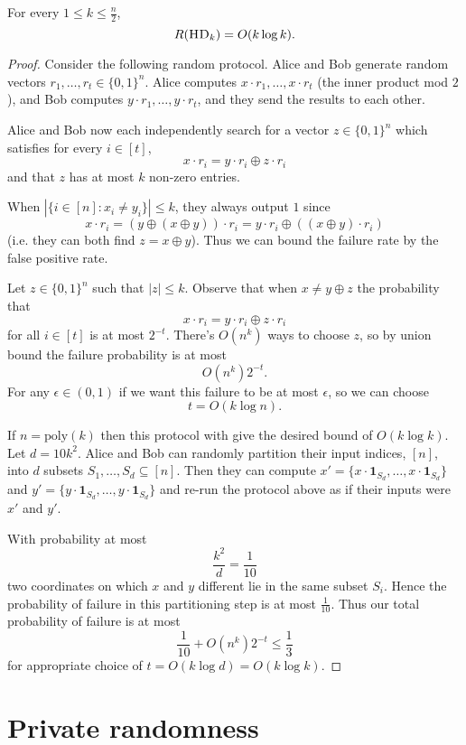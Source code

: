 \begin{theorem}
For every $1 \le k \le \frac n2$,
\[
R(\textsc{HD}_k) = O( k \log k).
\]
\end{theorem}

\begin{proof}
Consider the following random protocol. Alice and Bob generate random vectors $r_1, \dots, r_t \in \{0,1\}^n.$ Alice computes $x\cdot r_1, \dots, x\cdot r_t$ (the inner product mod $2$), and Bob computes $y\cdot r_1, \dots, y \cdot r_t$, and they send the results to each other.

Alice and Bob now each independently search for a vector $z \in \{0,1\}^n$ which satisfies for every $i\in[t]$,
$$x\cdot r_i = y\cdot r_i \oplus z \cdot r_i$$
and that $z$ has at most $k$ non-zero entries.

When $|\{i \in [n]: x_i \neq y_i\}| \leq k$, they always output $1$ since 
$$x\cdot r_i = (y \oplus (x\oplus y)) \cdot r_i = y\cdot r_i \oplus((x\oplus y) \cdot r_i) $$ 
(i.e. they can both find $z= x\oplus y$). Thus we can bound the failure rate by the false positive rate.

Let $z \in \{0,1\}^n$ such that $|z| \leq k$. Observe that when $x \neq y \oplus z$ the probability that 
$$x\cdot r_i = y\cdot r_i \oplus z\cdot r_i$$
for all $i \in [t]$ is at most $2^{-t}$. There's $O(n^k)$ ways to choose $z$, so by union bound the failure probability is at most
$$O(n^k)2^{-t}.$$
For any $\epsilon \in (0,1)$ if we want this failure to be at most $\epsilon$, so we can choose
$$t = O(k \log n).$$

If $n = \text{poly}(k)$ then this protocol with give the desired bound of $O(k \log k)$. Let $d = 10k^2$. Alice and Bob can randomly partition their input indices, $[n]$, into $d$ subsets $S_1, \dots, S_d\subseteq [n]$. Then they can compute $x'=\{x\cdot \mathbf{1}_{S_d},\dots, x\cdot \mathbf{1}_{S_d}\}$ and $y'=\{y\cdot \mathbf{1}_{S_d},\dots, y\cdot \mathbf{1}_{S_d}\}$ and re-run the protocol above as if their inputs were $x'$ and $y'$. 

With probability at most $$\frac{k^2}{d} = \frac{1}{10}$$
two coordinates on which $x$ and $y$ different lie in the same subset $S_i$. Hence the probability of failure in this partitioning step is at most $\frac{1}{10}$. Thus our total probability of failure is at most 
$$\frac{1}{10} + O(n^k)2^{-t} \leq \frac{1}{3}$$
for appropriate choice of $t = O(k\log d) = O(k\log k).$
\end{proof}


\newpage 
\section{Private randomness}

